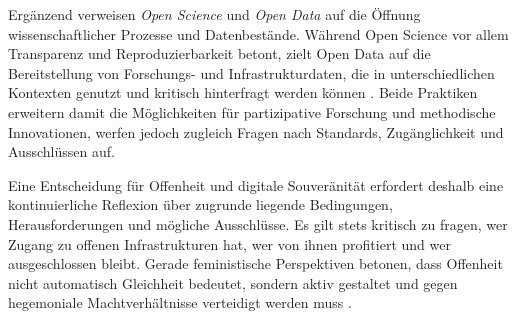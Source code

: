 Ergänzend verweisen \emph{Open Science} und \emph{Open Data} auf die Öffnung wissenschaftlicher Prozesse und Datenbestände. Während Open Science vor allem Transparenz und Reproduzierbarkeit betont, zielt Open Data auf die Bereitstellung von Forschungs- und Infrastrukturdaten, die in unterschiedlichen Kontexten genutzt und kritisch hinterfragt werden können \parencite{fecherWhatDrivesAcademic2014}. Beide Praktiken erweitern damit die Möglichkeiten für partizipative Forschung und methodische Innovationen, werfen jedoch zugleich Fragen nach Standards, Zugänglichkeit und Ausschlüssen auf.

Eine Entscheidung für Offenheit und digitale Souveränität erfordert deshalb eine kontinuierliche Reflexion über zugrunde liegende Bedingungen, Herausforderungen und mögliche Ausschlüsse. Es gilt stets kritisch zu fragen, wer Zugang zu offenen Infrastrukturen hat, wer von ihnen profitiert und wer ausgeschlossen bleibt. Gerade feministische Perspektiven betonen, dass Offenheit nicht automatisch Gleichheit bedeutet, sondern aktiv gestaltet und gegen hegemoniale Machtverhältnisse verteidigt werden muss \parencite{wilshireTimeRebootFeminism2024}.